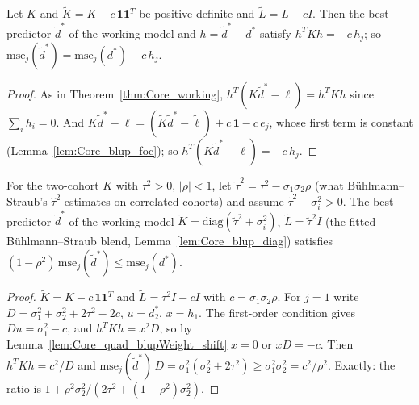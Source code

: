 \begin{lemma}\label{lem:Core_quad_blupWeight_shift}
  \leanok
  Let $K$ and $\tilde K = K - c\,\mathbf 1\mathbf 1^T$ be positive definite and
  $\tilde L = L - cI$. Then the best predictor $\tilde d^*$ of the working model and
  $h = \tilde d^* - d^*$ satisfy $h^TKh = -c\,h_j$; so
  $\mathrm{mse}_j(\tilde d^*) = \mathrm{mse}_j(d^*) - c\,h_j$.
\end{lemma}
\begin{proof}
  \leanok
  As in Theorem~\ref{thm:Core_working}, $h^T(K\tilde d^* - \ell) = h^TKh$ since $\sum_i h_i = 0$.
  And $K\tilde d^* - \ell = (\tilde K\tilde d^* - \tilde\ell) + c\,\mathbf 1 - c\,e_j$, whose
  first term is constant (Lemma~\ref{lem:Core_blup_foc}); so $h^T(K\tilde d^* - \ell) = -c\,h_j$.
\end{proof}

\begin{theorem}\label{thm:TwoCohorts_pseudoTrue}
  \leanok
  For the two-cohort $K$ with $\tau^2 > 0$, $|\rho| < 1$, let $\tilde\tau^2 = \tau^2 - \sigma_1\sigma_2\rho$
  (what Bühlmann--Straub's $\hat\tau^2$ estimates on correlated cohorts) and assume
  $\tilde\tau^2 + \sigma_i^2 > 0$. The best predictor $\tilde d^*$ of the working model
  $\tilde K = \mathrm{diag}(\tilde\tau^2 + \sigma_i^2)$, $\tilde L = \tilde\tau^2I$ (the fitted
  Bühlmann--Straub blend, Lemma~\ref{lem:Core_blup_diag}) satisfies
  $(1-\rho^2)\,\mathrm{mse}_j(\tilde d^*) \le \mathrm{mse}_j(d^*)$.
\end{theorem}
\begin{proof}
  \leanok
  $\tilde K = K - c\,\mathbf 1\mathbf 1^T$ and $\tilde L = \tau^2 I - cI$ with $c = \sigma_1\sigma_2\rho$.
  For $j = 1$ write $D = \sigma_1^2 + \sigma_2^2 + 2\tau^2 - 2c$, $u = d^*_2$, $x = h_1$. The
  first-order condition gives $Du = \sigma_1^2 - c$, and $h^TKh = x^2D$, so by
  Lemma~\ref{lem:Core_quad_blupWeight_shift} $x = 0$ or $xD = -c$. Then
  $h^TKh = c^2/D$ and $\mathrm{mse}_j(\tilde d^*)\,D = \sigma_1^2(\sigma_2^2 + 2\tau^2) \ge
  \sigma_1^2\sigma_2^2 = c^2/\rho^2$. Exactly: the ratio is
  $1 + \rho^2\sigma_2^2/(2\tau^2 + (1-\rho^2)\sigma_2^2)$.
\end{proof}

